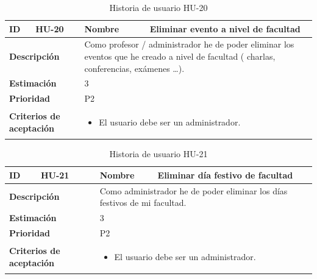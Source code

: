 \begin{table}[H]
    \centering
    \begin{tabular}{|p{2cm}|p{4cm}|p{2cm}|p{4cm}|}
        \hline
        \textbf{ID} & HU-20 & \textbf{Nombre} & Eliminar evento a nivel de facultad \\
        \hline
        \multicolumn{2}{|p{6cm}|}{\textbf{Descripción}} & \multicolumn{2}{p{6cm}|}{Como profesor / administrador he de poder eliminar los eventos que he creado a nivel de facultad ( charlas, conferencias, exámenes …).} \\
        \hline
        \multicolumn{2}{|p{6cm}|}{\textbf{Estimación}} & \multicolumn{2}{p{6cm}|}{3} \\
        \hline
        \multicolumn{2}{|p{6cm}|}{\textbf{Prioridad}} & \multicolumn{2}{p{6cm}|}{P2} \\
        \hline
        \multicolumn{2}{|p{6cm}|}{\textbf{Criterios de aceptación}} & \multicolumn{2}{p{6cm}|}{
            \begin{itemize}
                \item El usuario debe ser un administrador.
            \end{itemize}
        } \\
        \hline
    \end{tabular}
    \caption{Historia de usuario HU-20}
    \label{tab:hu_20}
\end{table}

\begin{table}[H]
    \centering
    \begin{tabular}{|p{2cm}|p{4cm}|p{2cm}|p{4cm}|}
        \hline
        \textbf{ID} & HU-21 & \textbf{Nombre} & Eliminar día festivo de facultad \\
        \hline
        \multicolumn{2}{|p{6cm}|}{\textbf{Descripción}} & \multicolumn{2}{p{6cm}|}{Como administrador he de poder eliminar los días festivos de mi facultad.} \\
        \hline
        \multicolumn{2}{|p{6cm}|}{\textbf{Estimación}} & \multicolumn{2}{p{6cm}|}{3} \\
        \hline
        \multicolumn{2}{|p{6cm}|}{\textbf{Prioridad}} & \multicolumn{2}{p{6cm}|}{P2} \\
        \hline
        \multicolumn{2}{|p{6cm}|}{\textbf{Criterios de aceptación}} & \multicolumn{2}{p{6cm}|}{
            \begin{itemize}
                \item El usuario debe ser un administrador.
            \end{itemize}
        } \\
        \hline
    \end{tabular}
    \caption{Historia de usuario HU-21}
    \label{tab:hu_21}
\end{table}

